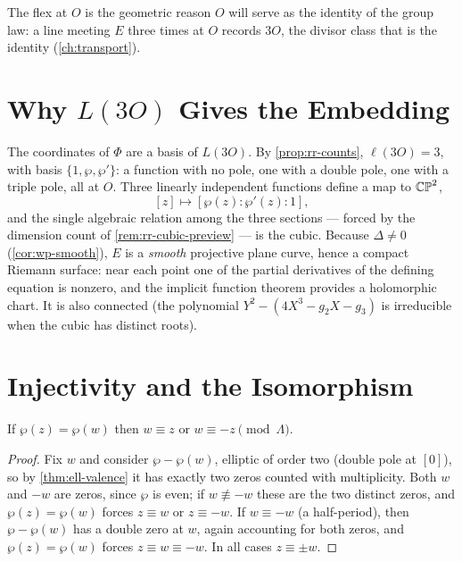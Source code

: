 The flex at \(O\) is the geometric reason \(O\) will serve as the identity of the
group law: a line meeting \(E\) three times at \(O\) records \(3O\), the divisor
class that is the identity (\cref{ch:transport}).

\section{Why \texorpdfstring{$L(3O)$}{L(3O)} Gives the Embedding}
\label{sec:emb-l3o}

The coordinates of \(\Phi\) are a basis of \(L(3O)\). By
\cref{prop:rr-counts}, \(\ell(3O) = 3\), with basis \(\{1, \wp, \wp'\}\): a function
with no pole, one with a double pole, one with a triple pole, all at \(O\). Three
linearly independent functions define a map to \(\mathbb{CP}^2\),
\[
  [z] \longmapsto [\wp(z) : \wp'(z) : 1],
\]
and the single algebraic relation among the three sections --- forced by the
dimension count of \cref{rem:rr-cubic-preview} --- is the cubic. Because
\(\Delta \ne 0\) (\cref{cor:wp-smooth}), \(E\) is a \emph{smooth} projective plane
curve, hence a compact Riemann surface: near each point one of the partial
derivatives of the defining equation is nonzero, and the implicit function
theorem provides a holomorphic chart. It is also connected (the polynomial
\(Y^2 - (4X^3 - g_2 X - g_3)\) is irreducible when the cubic has distinct roots).

\section{Injectivity and the Isomorphism}
\label{sec:emb-iso}

\begin{lemma}
\label{lem:emb-fibers}
If \(\wp(z) = \wp(w)\) then \(w \equiv z\) or \(w \equiv -z \pmod\Lambda\).
\end{lemma}

\begin{proof}
Fix \(w\) and consider \(\wp - \wp(w)\), elliptic of order two (double pole at
\([0]\)), so by \cref{thm:ell-valence} it has exactly two zeros counted with
multiplicity. Both \(w\) and \(-w\) are zeros, since \(\wp\) is even; if
\(w \not\equiv -w\) these are the two distinct zeros, and \(\wp(z) = \wp(w)\)
forces \(z \equiv w\) or \(z \equiv -w\). If \(w \equiv -w\) (a half-period), then
\(\wp - \wp(w)\) has a double zero at \(w\), again accounting for both zeros, and
\(\wp(z) = \wp(w)\) forces \(z \equiv w \equiv -w\). In all cases
\(z \equiv \pm w\).
\end{proof}

